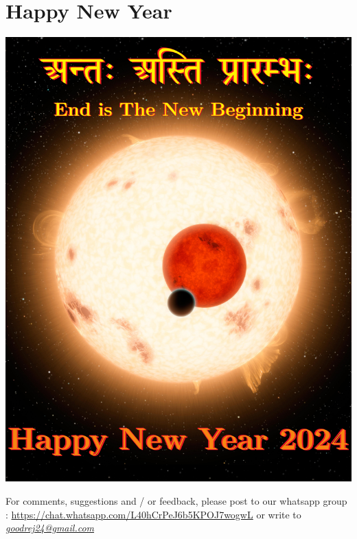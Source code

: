 \documentclass[makeidx, 11pt, oneside, onecolumn, openright, final, svgnames, dvipsnames, extrafontsizes]{memoir}
\begin{document}
\chapter{Happy New Year}
\begin{center}
\includegraphics[scale=1.0]{last.jpeg}
\end{center}


{\large 
For comments, suggestions and / or feedback, please post to our whatsapp group :
\url{https://chat.whatsapp.com/L40hCrPeJ6b5KPOJ7wogwL} or write to  
{\color{BurntOrange}\emph{\href{mailto:goodrej24@gmail.com}{goodrej24@gmail.com}}}}
\end{document}
